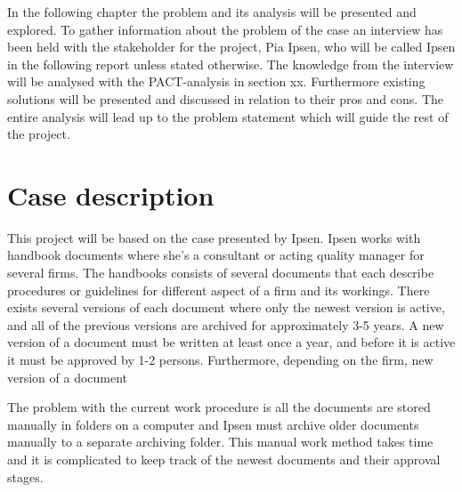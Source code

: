 In the following chapter the problem and its analysis will be presented and explored. 
To gather information about the problem of the case an interview has been held with the stakeholder for the project, Pia Ipsen, who will be called Ipsen in the following report unless stated otherwise.
The knowledge from the interview will be analysed with the PACT-analysis in section xx.
Furthermore existing solutions will be presented and discussed in relation to their pros and cons.
The entire analysis will lead up to the problem statement which will guide the rest of the project.

\section{Case description} \label{case}

This project will be based on the case presented by Ipsen.
Ipsen works with handbook documents where she's a consultant or acting quality manager for several firms.
The handbooks consists of several documents that each describe procedures or guidelines for different aspect of a firm and its workings.
There exists several versions of each document where only the newest version is active, and all of the previous versions are archived for approximately 3-5 years.
A new version of a document must be written at least once a year, and before it is active it must be approved by 1-2 persons.
Furthermore, depending on the firm, new version of a document 

The problem with the current work procedure is all the documents are stored manually in folders on a computer and Ipsen must archive older documents manually to a separate archiving folder. This manual work method takes time and it is complicated to keep track of the newest documents and their approval stages.
